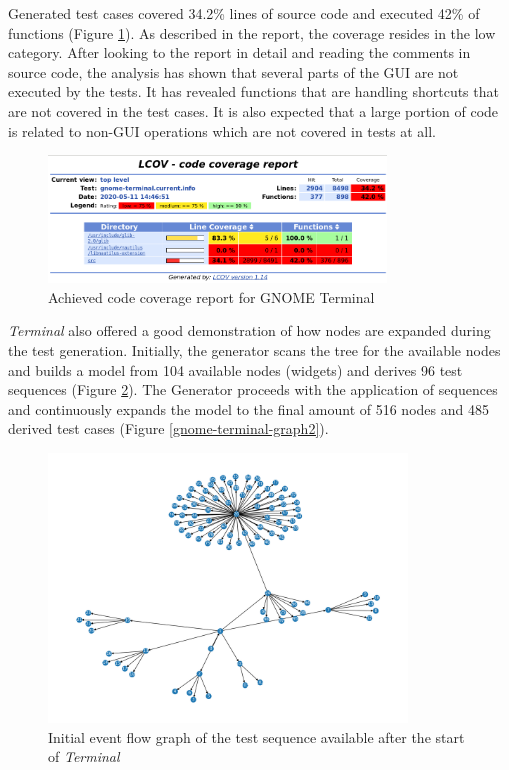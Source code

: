 Generated test cases covered 34.2\% lines of source code and executed 42\% of functions (Figure \ref{gnome-terminal-coverage}). As described in the report, the coverage resides in the low category. After looking to the report in detail and reading the comments in source code, the analysis has shown that several parts of the GUI are not executed by the tests. It has revealed functions that are handling shortcuts that are not covered in the test cases. It is also expected that a large portion of code is related to non-GUI operations which are not covered in tests at all.

\begin{figure}[H]
	\centering
	\includegraphics[width=0.8\textwidth,clip]{obrazky-figures/gnome-termina-coverage.png}
	\caption{Achieved code coverage report for GNOME Terminal}
	\label{gnome-terminal-coverage}
\end{figure}

\textit{Terminal} also offered a good demonstration of how nodes are expanded during the test generation. Initially, the generator scans the tree for the available nodes and builds a model from 104 available nodes (widgets) and derives 96 test sequences (Figure \ref{gnome-terminal-graph1}). The Generator proceeds with the application of sequences and continuously expands the model to the final amount of 516 nodes and 485 derived test cases (Figure \ref{gnome-terminal-graph2}).

\begin{figure}[H]
	\centering
	\includegraphics[width=0.85\textwidth,clip]{obrazky-figures/gnome-terminal_n_start.png}
	\caption{Initial event flow graph of the test sequence available after the start of \textit{Terminal}}
	\label{gnome-terminal-graph1}
\end{figure}

